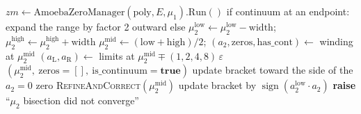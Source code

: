 \begin{algorithm}
\caption{\textsc{FindMu2ForA2Zero}$(\mathrm{poly},E,\mu_1,zm;\mu_2^{\mathrm{low}},\mu_2^{\mathrm{high}},\mathrm{tol},n_{\max})$\\
inner bisection: $a_2(\mu_2)=0$, with a Newton correction using the analytic $\mathrm{d}a_2/\mathrm{d}\mu_2$.}
\label{alg:find-mu2}
\begin{algorithmic}[1]
 \State $zm\gets\mathrm{AmoebaZeroManager}(\mathrm{poly},E,\mu_1).\mathrm{Run}()$  \EndIf
\State {}
  \State if continuum at an endpoint: expand the range by factor 2 outward
  \State else $\mu_2^{\mathrm{low}}\gets\mu_2^{\mathrm{low}}-\mathrm{width}$; $\mu_2^{\mathrm{high}}\gets\mu_2^{\mathrm{high}}+\mathrm{width}$ 
\EndWhile
\State {}
  \State $\mu_2^{\mathrm{mid}}\gets(\mathrm{low}+\mathrm{high})/2$; $(a_2,\mathrm{zeros},\mathrm{has\_cont})\gets$ winding at $\mu_2^{\mathrm{mid}}$
    \State $(a_{\mathrm{L}},a_{\mathrm{R}})\gets$ limits at $\mu_2^{\mathrm{mid}}\mp(1,2,4,8)\,\varepsilon$
      \State \Return $(\mu_2^{\mathrm{mid}},\ \mathrm{zeros}{=}[],\ \mathrm{is\_continuum}{=}\mathbf{true})$ 
    \Else
      \State update bracket toward the side of the $a_2=0$ zero 
    \EndIf
    \State \Return \textsc{RefineAndCorrect}$(\mu_2^{\mathrm{mid}})$ 
  \Else
    \State update bracket by $\operatorname{sign}(a_2^{\mathrm{low}}\cdot a_2)$
  \EndIf
\EndFor
\State \textbf{raise} ``$\mu_2$ bisection did not converge''
\end{algorithmic}
\end{algorithm}

